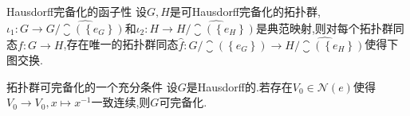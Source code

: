 \begin{corollary}{Hausdorff完备化的函子性}{}
	设$G,H$是可Hausdorff完备化的拓扑群,$\iota_{1}:G\to\widehat{G/\closure\left(\left\{e_{G}\right\}\right)}$和$\iota_{2}:H\to\widehat{H/\closure\left(\left\{e_{H}\right\}\right)}$是典范映射,则对每个拓扑群同态$f:G\to H$,存在唯一的拓扑群同态$\hat{f}:\widehat{G/\closure\left(\left\{e_{G}\right\}\right)}\to\widehat{H/\closure\left(\left\{e_{H}\right\}\right)}$使得下图交换.
	\begin{center}
	\end{center}
\end{corollary}

\begin{proposition}{拓扑群可完备化的一个充分条件}{}
	设$G$是Hausdorff的.若存在$V_{0}\in\mathcal{N}\left(e\right)$使得$V_{0}\to V_{0},x\mapsto x^{-1}$一致连续,则$G$可完备化.
\end{proposition}


